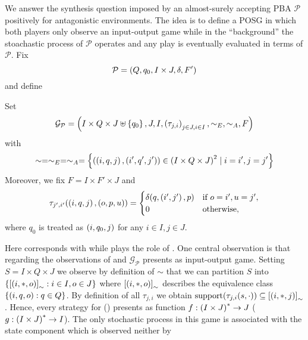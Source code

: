We answer the synthesis question imposed by an almost-surely accepting \ac{PBA}
$\mathcal{P}$ positively for antagonistic environments. The idea is to define a
\ac{POSG} in which both players only observe an input-output game while in the
\enquote{background} the stoachastic process of $\mathcal{P}$ operates and any
play is eventually evaluated in terms of $\mathcal{P}$. Fix
\begin{equation*}
  \mathcal{P} = \left(Q, q_{0}, I\times J, \delta, F'\right)
\end{equation*}
and define
\begin{definition}
  Set
  \begin{equation*}
    \mathcal{G}_{\mathcal{P}} = \left(I\times Q\times J\uplus\left\{q_{0}\right\}, J,
      I, \left(\tau_{j,i}\right)_{j\in J,i\in I}, \sim_{E}, \sim_{A}, F\right)
  \end{equation*}
  with
  \begin{equation*}
    \sim = \sim_{E} = \sim_{A} = \left\{\left(\left(i, q, j\right), 
    \left(i', q', j'\right)\right)\in \left(I\times Q\times J\right)^{2}\mid i = i', j = j'\right\}
  \end{equation*}
  Moreover, we fix $F = I\times F'\times J$ and
  \begin{equation*}
    \tau_{j',i'}(\left(i, q, j\right), \left(o, p, u\right)) = \begin{cases}
      \delta(q, \left(i', j'\right), p)&\text{if }o = i', u = j',\\
      0&\text{otherwise},
    \end{cases}
  \end{equation*}
  where $q_{0}$ is treated as $\left(i, q_{0}, j\right)$ for any $i\in I, j\in J$.
\end{definition}
Here \eve{} corresponds with \outputp{} while \adam{} plays the role of 
. One central observation is that regarding the observations of \eve{} 
and \adam{} $\mathcal{G}_{\mathcal{P}}$ presents as input-output game. Setting 
$S = I\times Q\times J$ we observe by definition of $\sim$ that we can 
partition $S$ into $\left\{\left[\left(i, *, o\right)\right]_{\sim}:i\in I, o\in J\right\}$ 
where $\left[\left(i, *, o\right)\right]_{\sim}$ describes the equivalence class
$\left\{\left(i, q, o\right):q\in Q\right\}$. By definition of all $\tau_{j,i}$ we obtain
$\operatorname{support}(\tau_{j,i}(s, \cdot))\subseteq\left[\left(i,*,j\right)\right]_{\sim}$. Hence,
every strategy for \eve{} (\adam{}) presents as function 
$f:\left(I\times J\right)^{*}\rightarrow J$ 
($g:\left(I\times J\right)^{*}\rightarrow I$). The only stochastic process in this
game is associated with the state component which is observed neither by 
